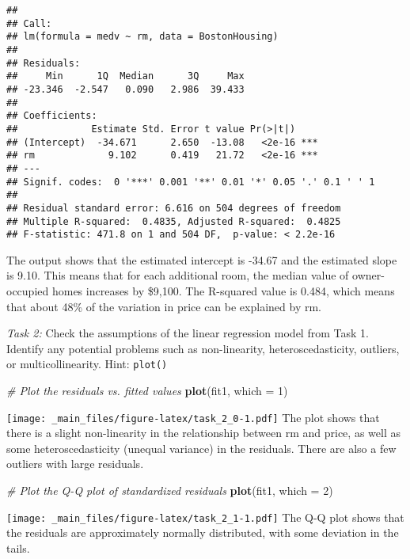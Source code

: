 \documentclass[
]{book}
\newenvironment{Shaded}{\begin{snugshade}}{\end{snugshade}}
\newcommand{\AttributeTok}[1]{\textcolor[rgb]{0.13,0.29,0.53}{#1}}
\newcommand{\CommentTok}[1]{\textcolor[rgb]{0.56,0.35,0.01}{\textit{#1}}}
\newcommand{\DecValTok}[1]{\textcolor[rgb]{0.00,0.00,0.81}{#1}}
\newcommand{\FunctionTok}[1]{\textcolor[rgb]{0.13,0.29,0.53}{\textbf{#1}}}
\newcommand{\NormalTok}[1]{#1}
\begin{document}
\begin{verbatim}
## 
## Call:
## lm(formula = medv ~ rm, data = BostonHousing)
## 
## Residuals:
##     Min      1Q  Median      3Q     Max 
## -23.346  -2.547   0.090   2.986  39.433 
## 
## Coefficients:
##             Estimate Std. Error t value Pr(>|t|)    
## (Intercept)  -34.671      2.650  -13.08   <2e-16 ***
## rm             9.102      0.419   21.72   <2e-16 ***
## ---
## Signif. codes:  0 '***' 0.001 '**' 0.01 '*' 0.05 '.' 0.1 ' ' 1
## 
## Residual standard error: 6.616 on 504 degrees of freedom
## Multiple R-squared:  0.4835, Adjusted R-squared:  0.4825 
## F-statistic: 471.8 on 1 and 504 DF,  p-value: < 2.2e-16
\end{verbatim}

The output shows that the estimated intercept is -34.67 and the estimated slope is 9.10. This means that for each additional room, the median value of owner-occupied homes increases by \$9,100. The R-squared value is 0.484, which means that about 48\% of the variation in price can be explained by rm.

\emph{Task 2:} Check the assumptions of the linear regression model from Task 1. Identify any potential problems such as non-linearity, heteroscedasticity, outliers, or multicollinearity. Hint: \texttt{plot()}

\begin{Shaded}
\begin{Highlighting}[]
\CommentTok{\# Plot the residuals vs. fitted values}
\FunctionTok{plot}\NormalTok{(fit1, }\AttributeTok{which =} \DecValTok{1}\NormalTok{)}
\end{Highlighting}
\end{Shaded}

\texttt{[image: \_main\_files/figure-latex/task\_2\_0-1.pdf]}
The plot shows that there is a slight non-linearity in the relationship between rm and price, as well as some heteroscedasticity (unequal variance) in the residuals. There are also a few outliers with large residuals.

\begin{Shaded}
\begin{Highlighting}[]
\CommentTok{\# Plot the Q{-}Q plot of standardized residuals}
\FunctionTok{plot}\NormalTok{(fit1, }\AttributeTok{which =} \DecValTok{2}\NormalTok{)}
\end{Highlighting}
\end{Shaded}

\texttt{[image: \_main\_files/figure-latex/task\_2\_1-1.pdf]}
The Q-Q plot shows that the residuals are approximately normally distributed, with some deviation in the tails.
\end{document}
